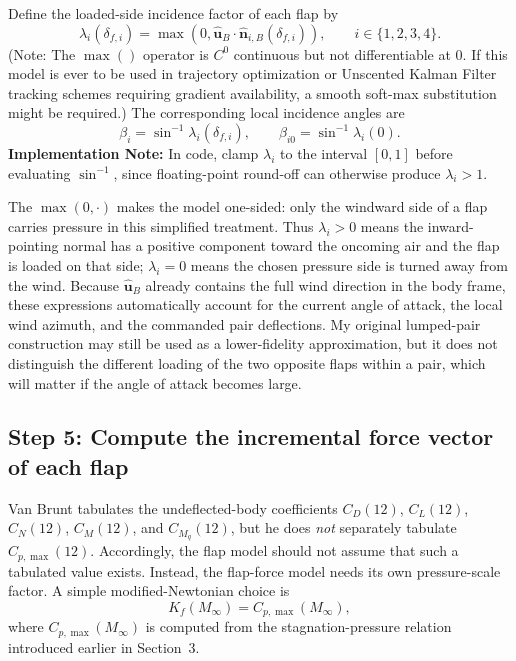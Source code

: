 Define the loaded-side incidence factor of each flap by
\begin{equation}
\lambda_i(\delta_{f,i})
=
\max\!\left(0,\hat{\mathbf u}_B\cdot \hat{\mathbf n}_{i,B}(\delta_{f,i})\right),
\qquad
i\in\{1,2,3,4\}. \label{eq:incidence_factor}
\end{equation}
(Note: The \(\max()\) operator is \(C^0\) continuous but not differentiable at \(0\). If this model is ever to be used in trajectory optimization or Unscented Kalman Filter tracking schemes requiring gradient availability, a smooth soft-max substitution might be required.)
The corresponding local incidence angles are
\begin{equation}
\beta_i=\sin^{-1}\lambda_i(\delta_{f,i}),
\qquad
\beta_{i0}=\sin^{-1}\lambda_i(0). \label{eq:incidence_angle}
\end{equation}
\textbf{Implementation Note:} In code, clamp \(\lambda_i\) to the interval \([0,1]\) before evaluating \(\sin^{-1}\), since floating-point round-off can otherwise produce \(\lambda_i>1\).

The \(\max(0,\cdot)\) makes the model one-sided: only the windward side of a flap carries pressure in this simplified treatment. Thus \(\lambda_i>0\) means the inward-pointing normal has a positive component toward the oncoming air and the flap is loaded on that side; \(\lambda_i=0\) means the chosen pressure side is turned away from the wind. Because \(\hat{\mathbf u}_B\) already contains the full wind direction in the body frame, these expressions automatically account for the current angle of attack, the local wind azimuth, and the commanded pair deflections. My original lumped-pair construction may still be used as a lower-fidelity approximation, but it does not distinguish the different loading of the two opposite flaps within a pair, which will matter if the angle of attack becomes large.

\subsection{Step 5: Compute the incremental force vector of each flap}

Van Brunt tabulates the undeflected-body coefficients \(C_D(12)\), \(C_L(12)\), \(C_N(12)\), \(C_M(12)\), and \(C_{M_q}(12)\), but he does \emph{not} separately tabulate \(C_{p,\max}(12)\). Accordingly, the flap model should not assume that such a tabulated value exists. Instead, the flap-force model needs its own pressure-scale factor. A simple modified-Newtonian choice is
\begin{equation}
K_f(M_\infty)=C_{p,\max}(M_\infty), \label{eq:kf_pressure_scale}
\end{equation}
where \(C_{p,\max}(M_\infty)\) is computed from the stagnation-pressure relation introduced earlier in Section~3. 

